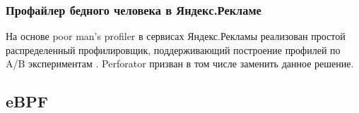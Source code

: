 \subsubsection{Профайлер бедного человека в Яндекс.Рекламе}
На основе poor man's profiler в сервисах Яндекс.Рекламы реализован простой распределенный профилировщик, поддерживающий
построение профилей по A/B экспериментам \cite{pmp:yabs}.
Perforator призван в том числе заменить данное решение.





\subsection{eBPF}
